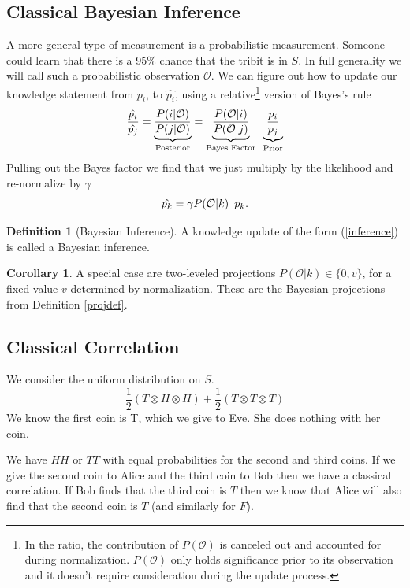 \documentclass[12pt,a4paper]{article}
\theoremstyle{myrule}
\theoremstyle{postulate}
\theoremstyle{definition}
\newtheorem{definition}{Definition}[section]
\newtheorem{corollary}{Corollary}[theorem]
\begin{document}
\subsection{Classical Bayesian Inference}
A more general type of measurement is a probabilistic measurement.  Someone could learn that there is a 95\% chance that the tribit is in $S$.  In full generality we will call such a probabilistic observation $\mathcal{O}$.  We can figure out how to update our knowledge statement from $p_i$, to $\hat{p_i}$, using a relative\footnote{In the ratio, the contribution of $P(\mathcal{O})$ is canceled out and accounted for during normalization.  $P(\mathcal{O})$ only holds significance prior to its observation and it doesn't require consideration during the update process.} version of Bayes's rule
\[
  \frac{\hat{p_i}}{\hat{p_j}} = \underbrace{\frac{P(i | \mathcal{O})}{P(j | \mathcal{O})}}_\text{Posterior}
                              = \underbrace{\frac{P(\mathcal{O} | i)}{P(\mathcal{O}|j)}}_\text{Bayes Factor}  \hspace{0.07 in}  \underbrace{\frac{p_i}{p_j}}_\text{Prior}
\]
Pulling out the Bayes factor we find that we just multiply by the likelihood and re-normalize by $\gamma$
\begin{equation}
\label{inference}
  \hat{p_k} =  \gamma P(\mathcal{O} | k) \hspace{0.07 in} p_k.
\end{equation}
\begin{definition}[Bayesian Inference]
\label{infdef}
  A knowledge update of the form (\ref{inference}) is called a Bayesian inference.
\end{definition}
\begin{corollary}
A special case are two-leveled projections $P(\mathcal{O} | k) \in \{0,v\}$, for a fixed value $v$ determined by normalization.  These are the Bayesian projections from Definition \ref{projdef}.
\end{corollary}

\subsection{Classical Correlation}
We consider the uniform distribution on $S$.
\[
\frac{1}{2}(T \otimes H \otimes H) + \frac{1}{2}(T \otimes T \otimes T)
\]
We know the first coin is T, which we give to Eve.  She does nothing with her coin.

We have $HH$ or $TT$ with equal probabilities for the second and third coins.  If we give the second coin to Alice and the third coin to Bob then we have a classical correlation.  If Bob finds that the third coin is $T$ then we know that Alice will also find that the second coin is $T$ (and similarly for $F$).
\end{document}
